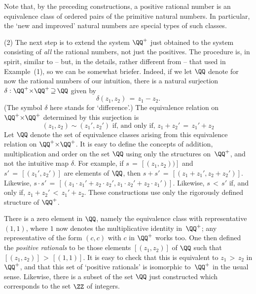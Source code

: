 {{{        Note that, by the preceding constructions, a positive rational number is an equivalence class of ordered pairs of the primitive natural numbers.
    In particular, the `new and improved' natural numbers are special types of such classes.


\VV

        (2) The next step is to extend the system ${\QQ}^{+}$ just obtained to the system consisting of {\em all} the rational numbers, not just the positives.
    The procedure is, in spirit, similar to -- but, in the details, rather different from -- that used in Example~(1), so we can be somewhat briefer.
    Indeed, if we let ${\QQ}$ denote for now the rational numbers of our intuition,
    there is a natural surjection ${\delta}:{\QQ}^{+}{\times}{\QQ}^{+} \,{\supseteq}\, {\QQ}$ given by
        \begin{displaymath}
        {\delta}(z_{1},z_{2}) \,=\, z_{1} - z_{2}.
        \end{displaymath}
    (The symbol ${\delta}$ here stands for `difference'.) The equivalence relation on ${\QQ}^{+}{\times}{\QQ}^{+}$ determined by this surjection is
        \begin{displaymath}
        (z_{1},z_{2}){\sim}(z_{1}',z_{2}') \mbox{ if, and only if, }
        z_{1} + z_{2}' \,=\, z_{1}' + z_{2}
        \end{displaymath}
    Let ${\QQ}$ denote the set of equivalence classes arising from this equivalence relation on ${\QQ}^{+}{\times}{\QQ}^{+}$.
    It is easy to define the concepts of addition, multiplication and order on the set ${\QQ}$ using only the structures on~${\QQ}^{+}$, and not the intuitive map ${\delta}$.
    For example, if $s \,=\, [(z_{1},z_{2}))]$ and $s' \,=\, [(z_{1}',z_{2}')]$ are elements of ${\QQ}$,
    then $s+s' \,=\, [(z_{1} + z_{1}', z_{2} + z_{2}')]$. Likewise, $s{\cdot}s' \,=\, [(z_{1}{\cdot}z_{1}' + z_{2}{\cdot}z_{2}', z_{1}{\cdot}z_{2}' + z_{2}{\cdot}z_{1}')]$.
    Likewise, $s\,<\,s'$ if, and only if, $z_{1} + z_{2}'\,<\,z_{1}' + z_{2}$. These constructions use only the rigorously defined structure of ${\QQ}^{+}$.

        There is a zero element in ${\QQ}$, namely the equivalence class with representative $(1,1)$,
    where $1$ now denotes the multiplicative identity in~${\QQ}^{+}$; any representative of the form $(c,c)$ with $c$ in ${\QQ}^{+}$ works too.
    One then defined the {\em positive rationals} to be those elements $[(z_{1},z_{2})]$ of ${\QQ}$ such that $[(z_{1},z_{2})]\,>\,[(1,1)]$.
    It is easy to check that this is equivalent to $z_{1}\,>\,z_{2}$ in ${\QQ}^{+}$,
    and that this set of `positive rationals' is isomorphic to~${\QQ}^{+}$ in the usual sense.
    Likewise, there is a subset of the set ${\QQ}$ just constructed which corresponds to the set ${\ZZ}$ of integers.

}}}
